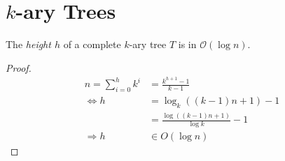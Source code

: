 \section{$k$-ary Trees}





\begin{lemma}The \emph{height $h$} of a complete $k$-ary tree $T$ is in $\mathcal{O}(\log n)$.
\end{lemma}
\begin{proof}
	\begin{align}
		n = \sum_{i=0}^{h}k^i &= \frac{k^{h+1}-1}{k-1}\\
		\Leftrightarrow h &= \log_k((k-1)n+1)-1\\
		&= \frac{\log((k-1)n+1)}{\log k}-1\\
		\Rightarrow h &\in O(\log n)
	\end{align}
\end{proof}


